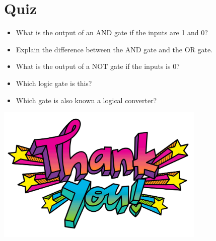 \documentclass[10pt,a4paper,onecolumn]{article}
\begin{document}
\section{Quiz}
\begin{itemize}
	\item What is the output of an AND gate if the inputs are 1 and 0?
	\item Explain the difference between the AND gate and the OR gate.
	\item What is the output of a NOT gate if the inputs is 0?
	\item Which logic gate is this?
	\item Which gate is also known 
	a logical converter?
\end{itemize}

\centering\includegraphics[width=10cm]{gst24}

\newpage


\end{document}
